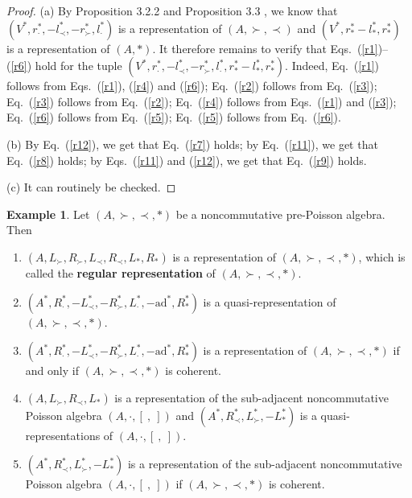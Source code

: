 \documentclass[12pt]{amsart}
\theoremstyle{definition}
\newtheorem{ex}[thm]{Example}
\begin{document}
\begin{proof} (a) By Proposition 3.2.2 \cite{B2} and Proposition 3.3 \cite{B1}, 
we know that $(V^*,r_{\cdot}^{*},-l_{\prec}^{*},-r_{\succ}^{*},l_{\cdot}^{*})$ is a
representation of $(A,\succ,\prec)$ and
$(V^{*},r_{\ast}^{*}-l_{\ast}^{*},r_{\ast}^{*})$ is a
representation of $(A,\ast)$. It therefore remains to verify that Eqs.~(\ref{r1})–(\ref{r6}) hold for the tuple
 $(V^*,r_{\cdot}^{*},-l_{\prec}^{*},-r_{\succ}^{*},l_{\cdot}^{*},r_{\ast}^{*}-l_{\ast}^{*},r_{\ast}^{*})$.
Indeed, Eq.~(\ref{r1}) follows from Eqs.~(\ref{r1}), (\ref{r4}) and (\ref{r6}); Eq.~(\ref{r2}) follows from Eq.~(\ref{r3});
Eq.~(\ref{r3}) follows from Eq.~(\ref{r2}); Eq.~(\ref{r4}) follows from Eqs.~(\ref{r1}) and (\ref{r3});
Eq.~(\ref{r6}) follows from Eq.~(\ref{r5}); Eq.~(\ref{r5}) follows from Eq.~(\ref{r6}).

(b) By Eq.~(\ref{r12}), we get that Eq.~(\ref{r7}) holds; by Eq.~(\ref{r11}), we get that Eq.~(\ref{r8}) holds;
by Eqs.~(\ref{r11}) and (\ref{r12}), we get that Eq.~(\ref{r9}) holds.

(c) It can routinely be checked.
\end{proof}

\begin{ex} \label {Cr} Let $(A,\succ,\prec,\ast)$ be a noncommutative pre-Poisson algebra.
Then  \begin{enumerate}
 \item $(A,L_{\succ}, R_{\succ},L_{\prec}, R_{\prec},L_{\ast}, R_{\ast})$ is a
representation of $(A,\succ,\prec,\ast)$, which is called the {\bf regular
representation} of $(A,\succ,\prec,\ast)$.
 \item $(A^{*},R_{\cdot}^{*},-L_{\prec}^{*},-R_{\succ}^{*},L_{\cdot}^{*},
-\mathrm{ad}^{*},R^{*}_{\ast})$ is a 
quasi-representation of $(A,\succ,\prec,\ast)$.
 \item $(A^{*},R_{\cdot}^{*},-L_{\prec}^{*},-R_{\succ}^{*},L_{\cdot}^{*},
 -\mathrm{ad}^{*},R^{*}_{\ast})$ is a
representation of $(A,\succ,\prec,\ast)$ if and only if $(A,\succ,\prec,\ast)$ is coherent.
 \item $(A, L_{\succ},R_{\prec},L_{\ast})$ is a representation of the sub-adjacent 
    noncommutative Poisson algebra $(A,\cdot,[ \ , \ ])$
 and $(A^{*},R_{\prec}^{*}, L_{\succ}^{*},-L_{\ast}^{*})$ is a quasi-representations of $(A,\cdot,[ \ , \ ])$.
\item  
 $(A^{*},R_{\prec}^{*}, L_{\succ}^{*},-L_{\ast}^{*})$ is a representation of the sub-adjacent 
    noncommutative Poisson algebra $(A,\cdot,[ \ , \ ])$ if  $(A,\succ,\prec,\ast)$ is coherent.
 \end{enumerate}
\end{ex}
\end{document}
